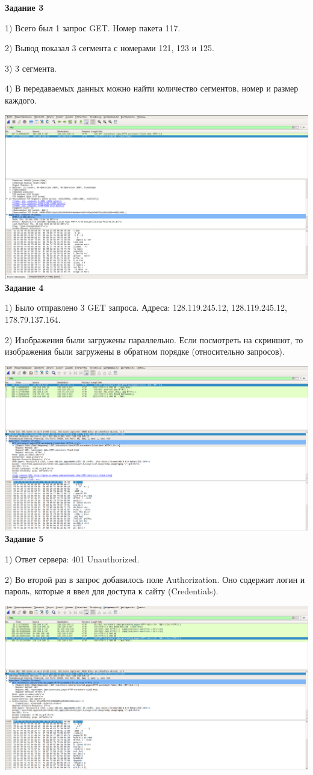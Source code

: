 \documentclass[11pt]{article}
\begin{document}
    {\bf Задание 3}

    1) Всего был 1 запрос GET.
    Номер пакета 117.

    2) Вывод показал 3 сегмента с номерами 121, 123 и 125.

    3) 3 сегмента.

    4) В передаваемых данных можно найти количество сегментов, номер и размер каждого.

    \includegraphics[width=\textwidth]{3.png}\\

    {\bf Задание 4}

    1) Было отправлено 3 GET запроса.
    Адреса: 128.119.245.12, 128.119.245.12, 178.79.137.164.

    2) Изображения были загружены параллельно.
    Если посмотреть на скриншот, то изображения были загружены в обратном порядке (относительно запросов).

    \includegraphics[width=\textwidth]{4.png}\\

    {\bf Задание 5}

    1) Ответ сервера: 401 Unauthorized.

    2) Во второй раз в запрос добавилось поле Authorization.
    Оно содержит логин и пароль, которые я ввел для доступа к сайту (Credentials).

    \includegraphics[width=\textwidth]{5.png}\\
\end{document}

